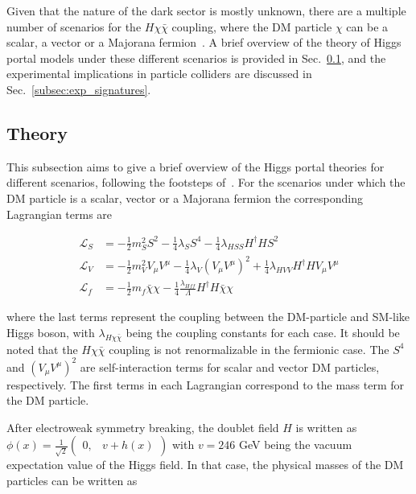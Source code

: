 Given that the nature of the dark sector is mostly unknown, there are a multiple number of scenarios for the $H \chi \bar{\chi}$ coupling,
where the DM particle $\chi$ can be a scalar, a vector or a Majorana fermion~\cite{Djouadi:2011aa}. A brief overview of the 
theory of Higgs portal models under these different scenarios is provided in Sec.~\ref{subsec:higgs_portal_theory}, and the experimental
implications in particle colliders are discussed in Sec.~\ref{subsec:exp_signatures}.

\subsection{Theory}
\label{subsec:higgs_portal_theory}

This subsection aims to give a brief overview of the Higgs portal theories for different scenarios, following the footsteps of~\cite{Djouadi:2011aa}.
For the scenarios under which the DM particle is a scalar, vector or a Majorana fermion the corresponding Lagrangian terms are 

\begin{equation}
    \begin{split}
        \mathcal{L}_{S} &= -\frac{1}{2} m_{S}^{2} S^{2} - \frac{1}{4} \lambda_{S} S^{4} - \frac{1}{4} \lambda_{HSS} H^{\dag} H S^{2} \\
        \mathcal{L}_{V} &= -\frac{1}{2} m_{V}^{2} V_{\mu} V^{\mu} - \frac{1}{4} \lambda_{V} (V_{\mu} V^{\mu})^{2} + \frac{1}{4} \lambda_{HVV} H^{\dag} H V_{\mu} V^{\mu} \\
        \mathcal{L}_{f} &= -\frac{1}{2} m_{f} \bar{\chi} \chi - \frac{1}{4} \frac{\lambda_{Hff}}{\Lambda} H^{\dag} H \bar{\chi} \chi
    \end{split}
    \label{eq:higgs_portal_lagrangians}
\end{equation}

where the last terms represent the coupling between the DM-particle and SM-like Higgs boson, with $\lambda_{H\chi\bar{\chi}}$ being the coupling constants for each case.
It should be noted that the $H\chi\bar{\chi}$ coupling is not renormalizable in the fermionic case. The $S^{4}$ and $(V_{\mu} V^{\mu})^{2}$ are self-interaction terms
for scalar and vector DM particles, respectively. The first terms in each Lagrangian correspond to the mass term for the DM particle.

After electroweak symmetry breaking, the doublet field $H$ is written as $\phi(x) = \frac{1}{\sqrt{2}} \begin{pmatrix} 0, & v + h(x) \end{pmatrix}$ with $v = 246$ GeV
being the vacuum expectation value of the Higgs field. In that case, the physical masses of the DM particles can be written as~\cite{Djouadi:2011aa}

